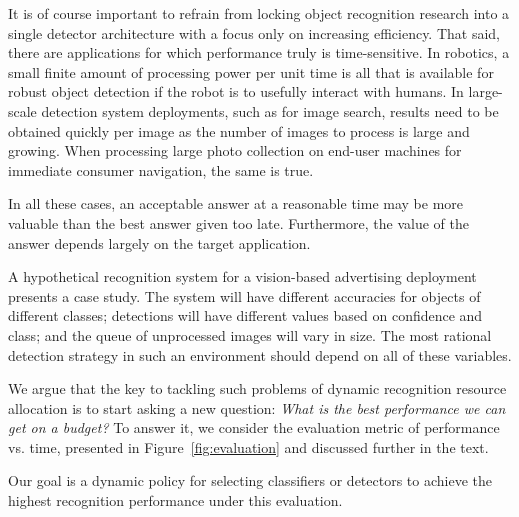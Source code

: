 It is of course important to refrain from locking object recognition research into a single detector architecture with a focus only on increasing efficiency.
That said, there are applications for which performance truly is time-sensitive.
In robotics, a small finite amount of processing power per unit time is all that is available for robust object detection if the robot is to usefully interact with humans.
In large-scale detection system deployments, such as for image search, results need to be obtained quickly per image as the number of images to process is large and growing.
When processing large photo collection on end-user machines for immediate consumer navigation, the same is true.

In all these cases, an acceptable answer at a reasonable time may be more valuable than the best answer given too late.
Furthermore, the value of the answer depends largely on the target application.

A hypothetical recognition system for a vision-based advertising deployment presents a case study.
The system will have different accuracies for objects of different classes; detections will have different values based on confidence and class; and the queue of unprocessed images will vary in size.
The most rational detection strategy in such an environment should depend on all of these variables.

We argue that the key to tackling such problems of dynamic recognition resource allocation is to start asking a new question:
\emph{What is the best performance we can get on a budget?}
To answer it, we consider the evaluation metric of performance vs. time, presented in Figure~\ref{fig:evaluation} and discussed further in the text.

Our goal is a dynamic policy for selecting classifiers or detectors to achieve the highest recognition performance under this evaluation.
